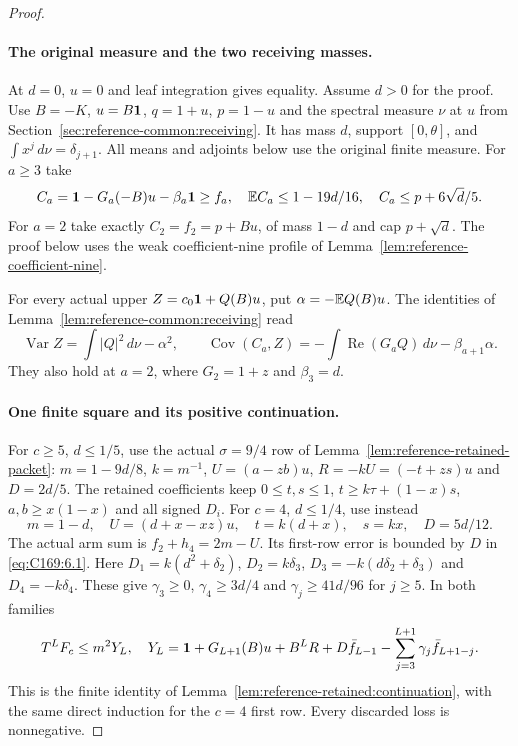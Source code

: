 \begin{proof}

\paragraph{The original measure and the two receiving masses.}
At $d=0$, $u=0$ and leaf integration gives equality. Assume $d>0$
for the proof.
Use $B=-K$, $u=B\mathbf1$, $q=1+u$, $p=1-u$ and the spectral measure
$\nu$ at $u$ from Section~\ref{sec:reference-common:receiving}.
It has mass $d$, support $[0,\theta]$, and $\int x^j\,d\nu=\delta_{j+1}$.
All means and adjoints below use the original finite measure.
For $a\ge3$ take
\[
 C_a=\mathbf1-G_a(-B)u-\beta_a\mathbf1\ge f_a,
 \quad\mathbb E C_a\le1-19d/16,\quad C_a\le p+6\sqrt d/5.
\]
For $a=2$ take exactly $C_2=f_2=p+Bu$, of mass $1-d$ and cap
$p+\sqrt d$. The proof below uses the weak coefficient-nine profile of Lemma~\ref{lem:reference-coefficient-nine}.

For every actual upper $Z=c_0\mathbf1+Q(B)u$, put
$\alpha=-\mathbb E Q(B)u$. The identities of
Lemma~\ref{lem:reference-common:receiving} read
\begin{equation}\label{eq:Q184:actual-moments}
 \operatorname{Var}Z=\int|Q|^2\,d\nu-\alpha^2,
 \qquad
 \operatorname{Cov}(C_a,Z)
 =-\int\operatorname{Re}(G_aQ)\,d\nu-\beta_{a+1}\alpha.
\end{equation}
They also hold at $a=2$, where $G_2=1+z$ and $\beta_3=d$.

\paragraph{One finite square and its positive continuation.}
For $c\ge5$, $d\le1/5$, use the actual $\sigma=9/4$ row of
Lemma~\ref{lem:reference-retained-packet}: $m=1-9d/8$, $k=m^{-1}$,
$U=(a-zb)u$, $R=-kU=(-t+zs)u$ and $D=2d/5$.
The retained coefficients keep $0\le t,s\le1$,
$t\ge k\tau+(1-x)s$, $a,b\ge x(1-x)$ and all signed $D_i$.
For $c=4$, $d\le1/4$, use instead
\[
 m=1-d,\quad U=(d+x-xz)u,\quad
 t=k(d+x),\quad s=kx,\quad D=5d/12.
\]
The actual arm sum is $f_2+h_4=2m-U$.
Its first-row error is bounded by $D$ in \eqref{eq:C169:6.1}.
Here $D_1=k(d^2+\delta_2)$, $D_2=k\delta_3$,
$D_3=-k(d\delta_2+\delta_3)$ and $D_4=-k\delta_4$.
These give $\gamma_3\ge0$, $\gamma_4\ge3d/4$ and
$\gamma_j\ge41d/96$ for $j\ge5$.
In both families
\begin{equation}\label{eq:Q184:duhamel}
 T^LF_c\le m^2Y_L,
 \quad
 Y_L=\mathbf1+G_{L+1}(B)u+B^LR+D\bar f_{L-1}
       -\sum_{j=3}^{L+1}\gamma_j\bar f_{L+1-j}.
\end{equation}
This is the finite identity of
Lemma~\ref{lem:reference-retained:continuation}, with the same direct
induction for the $c=4$ first row. Every discarded loss is nonnegative.


\end{proof}
